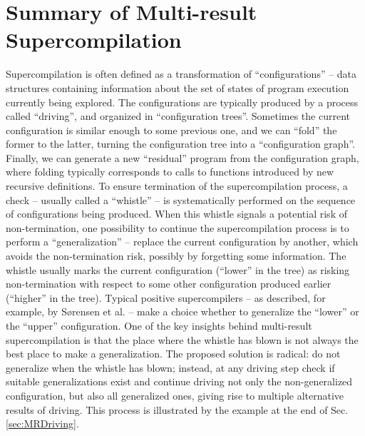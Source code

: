 \documentclass[submission,copyright,creativecommons]{eptcs}
\begin{document}
\section{Summary of Multi-result Supercompilation}\label{sec:MRSCSummary}

Supercompilation is often defined as a transformation of ``configurations'' --
data structures containing information about the set of states of program execution
currently being explored.
The configurations are typically produced by a process called ``driving'',
and organized in ``configuration trees''.
Sometimes the current configuration is similar enough to some previous one,
and we can ``fold'' the former to the latter,
turning the configuration tree into a ``configuration graph''.
Finally, we can generate a new ``residual'' program from the configuration
graph, where folding typically corresponds to calls to functions introduced by new
recursive definitions.
To ensure termination of the supercompilation process, a check -- usually called 
a ``whistle'' -- is systematically performed on the sequence of configurations
being produced.
When this whistle signals a potential risk of non-termination, one possibility
to continue the supercompilation process is to perform a ``generalization'' --
replace the current configuration by another, which avoids the non-termination
risk, possibly by forgetting some information.
The whistle usually marks the current configuration (``lower'' in the tree) as risking
non-termination with respect to some other configuration produced earlier (``higher'' in the tree).
Typical positive supercompilers -- as described, for example, by S{\o}rensen et al. \cite{sorm98b} --
make a choice whether to generalize the ``lower'' or the ``upper'' configuration.
One of the key insights behind multi-result supercompilation is that the place
where the whistle has blown is not always the best place to make a generalization.
The proposed solution is radical: do not generalize when the whistle has blown;
instead, at any driving step check if suitable generalizations exist and
continue driving not only the non-generalized configuration, but also
all generalized ones,
giving rise to multiple alternative results of driving.
This process is illustrated by the example at the end of Sec. \ref{sec:MRDriving}.
\end{document}
